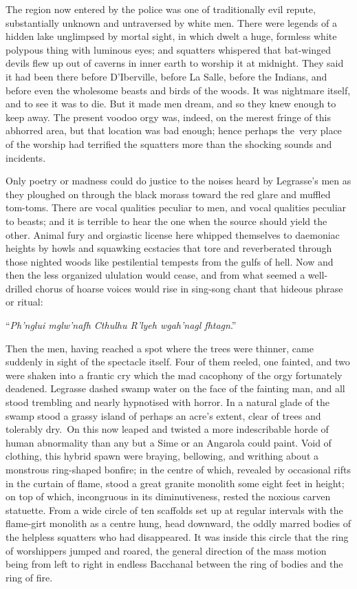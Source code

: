 The region now entered by the police was one of traditionally evil
repute, substantially unknown and untraversed by white men. There were
legends of a hidden lake unglimpsed by mortal sight, in which dwelt a
huge, formless white polypous thing with luminous eyes; and squatters
whispered that bat-winged devils flew up out of caverns in inner earth
to worship it at midnight. They said it had been there before
D'Iberville, before La Salle, before the Indians, and before even the
wholesome beasts and birds of the woods. It was nightmare itself, and to
see it was to die. But it made men dream, and so they knew enough to
keep away. The present voodoo orgy was, indeed, on the merest fringe of
this abhorred area, but that location was bad enough; hence perhaps the\est\ very place  of the worship had terrified the squatters more than the
shocking sounds and incidents.

Only poetry or madness could do justice to the noises heard by
Legrasse's men as they ploughed on through the black morass toward the
red glare and muffled tom-toms. There are vocal qualities peculiar to
men, and vocal qualities peculiar to beasts; and it is terrible to hear
the one when the source should yield the other. Animal fury and
orgiastic license here whipped themselves to daemoniac heights by howls
and squawking ecstacies that tore and reverberated through those nighted
woods like pestilential tempests from the gulfs of hell. Now and then
the less organized ululation would cease, and from what seemed a
well-drilled chorus of hoarse voices would rise in sing-song chant that
hideous phrase or ritual:

``\emph{Ph'nglui mglw'nafh Cthulhu R'lyeh wgah'nagl fhtagn}.''

Then the men, having reached a spot where the trees were thinner, came
suddenly in sight of the spectacle itself. Four of them reeled, one
fainted, and two were shaken into a frantic cry which the mad cacophony
of the orgy fortunately deadened. Legrasse dashed swamp water on the
face of the fainting man, and all stood trembling and nearly hypnotised
with horror.
In a natural glade of the swamp stood a grassy island of perhaps an
acre's extent, clear of trees and tolerably dry.\est\ On this now leaped and
twisted a more indescribable horde of human abnormality than any but a
Sime or an Angarola could paint. Void of clothing, this hybrid spawn
were braying, bellowing, and writhing about a monstrous ring-shaped
bonfire; in the centre of which, revealed by occasional rifts in the
curtain of flame, stood a great granite monolith some eight feet in
height; on top of which, incongruous in its diminutiveness, rested the
noxious carven statuette. From a wide circle of ten scaffolds set up at
regular intervals with the flame-girt monolith as a centre hung, head
downward, the oddly marred bodies of the helpless squatters who had
disappeared. It was inside this circle that the ring of worshippers
jumped and roared, the general direction of the mass motion being from
left to right in endless Bacchanal between the ring of bodies and the
ring of fire.

